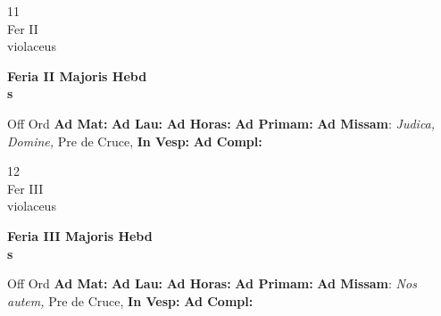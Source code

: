 \documentclass[10pt, openany]{book}
\begin{document}
        \begin{center}
            \begin{minipage}{3.5in}
                \vspace{2em}
                \begin{minipage}{0.5in}
                    {\Huge 11} \\
                    {\normalsize Fer II} \\
                    {\normalsize violaceus}
                \end{minipage}
                \begin{minipage}{3.0in}
                    \textbf{ \large Feria II Majoris Hebd \\
                    \textnormal{\normalsize s}} \\ 
                \end{minipage}
                \begin{justify}Off Ord
                    \textbf{Ad Mat: }
                    \textbf{Ad Lau: }
                    \textbf{Ad Horas: }
                    \textbf{Ad Primam: }\textbf{Ad Missam}: \textit{Judica, Domine,} Pre de Cruce,  
                    \textbf{In Vesp: }
                    \textbf{Ad Compl: }
                \end{justify}
            \end{minipage}
        \end{center}
    
        \begin{center}
            \begin{minipage}{3.5in}
                \vspace{2em}
                \begin{minipage}{0.5in}
                    {\Huge 12} \\
                    {\normalsize Fer III} \\
                    {\normalsize violaceus}
                \end{minipage}
                \begin{minipage}{3.0in}
                    \textbf{ \large Feria III Majoris Hebd \\
                    \textnormal{\normalsize s}} \\ 
                \end{minipage}
                \begin{justify}Off Ord
                    \textbf{Ad Mat: }
                    \textbf{Ad Lau: }
                    \textbf{Ad Horas: }
                    \textbf{Ad Primam: }\textbf{Ad Missam}: \textit{Nos autem,} Pre de Cruce,  
                    \textbf{In Vesp: }
                    \textbf{Ad Compl: }
                \end{justify}
            \end{minipage}
        \end{center}
    
\end{document}
